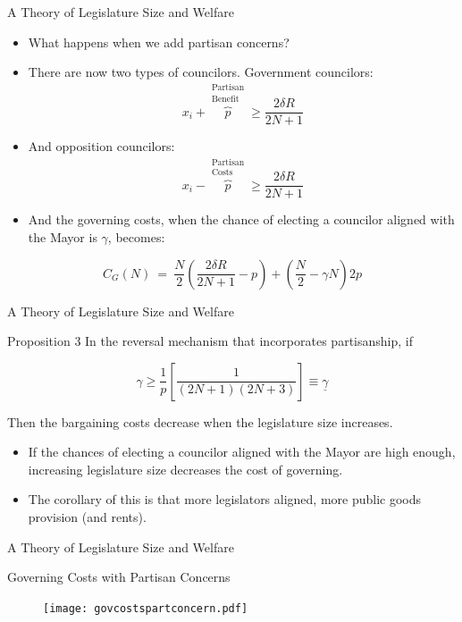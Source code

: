 \documentclass[11pt]{beamer}
\begin{document}
\begin{frame}{A Theory of Legislature Size and Welfare}
\begin{itemize}  \itemsep1em
  \item What happens when we add partisan concerns?
  \item There are now two types of councilors. Government councilors:
  \[
x_i + \overbrace{p}^{\substack{\text{Partisan} \\ \text{Benefit}}} \geq \dfrac{2\delta R}{2N+1}
\]
 \item And opposition councilors: 
 \[
x_i - \overbrace{p}^{\substack{\text{Partisan} \\ \text{Costs}}}  \geq \dfrac{2\delta R}{2N+1}
\]
\item And the governing costs, when the chance of electing a councilor aligned with the Mayor is $\gamma$, becomes:
\end{itemize}
\[
C_G(N) \ = \ \dfrac{N}{2}\left( \dfrac{2\delta R}{2N+1} - p \right) + \left(\dfrac{N}{2} - \gamma N \right)2p
\]
\end{frame}

\begin{frame}{A Theory of Legislature Size and Welfare}
\begin{block}{Proposition 3}
In the reversal mechanism that incorporates partisanship, if 

\[
\gamma \geq \dfrac{1}{p}\left[ \dfrac{1}{(2N+1)(2N+3)} \right] \equiv \underline{\gamma}
\]

Then the bargaining costs decrease when the legislature size increases.
\end{block}
\begin{itemize} \itemsep1em
    \item If the chances of electing a councilor aligned with the Mayor are high enough, increasing legislature size decreases the cost of governing.
    \item The corollary of this is that more legislators aligned, more public goods provision (and rents).
\end{itemize}
\end{frame}

\begin{frame}{A Theory of Legislature Size and Welfare}
  \begin{block}{Governing Costs with Partisan Concerns}
  \vspace{0.2in}
    \begin{figure}[htb]
      \centering
      \texttt{[image: govcostspartconcern.pdf]}
    \end{figure}
  \end{block}
\end{frame}
\end{document}
